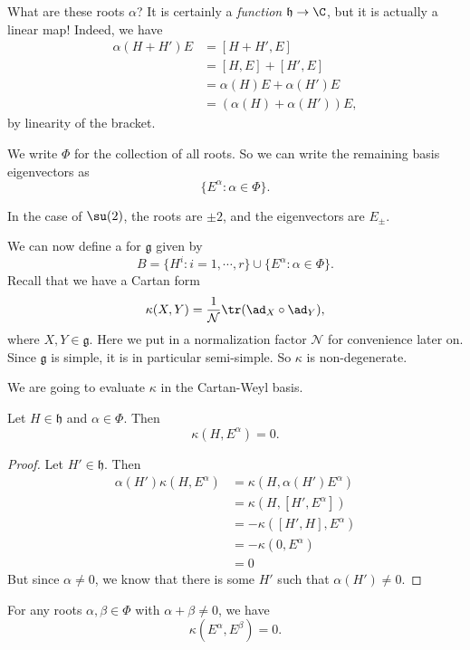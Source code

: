\documentclass[a4paper]{article}
\begin{document}
What are these roots $\alpha$? It is certainly a \emph{function} $\mathfrak{h} \to \C$, but it is actually a linear map! Indeed, we have
\begin{align*}
  \alpha(H + H')E &= [H + H', E] \\
  &= [H, E] + [H', E] \\
  &= \alpha(H) E + \alpha(H') E \\
  &= (\alpha(H) + \alpha(H'))E,
\end{align*}
by linearity of the bracket.

We write $\Phi$\index{$\Phi$} for the collection of all roots. So we can write the remaining basis eigenvectors as
\[
  \{E^\alpha: \alpha \in \Phi\}.
\]
\begin{eg}
  In the case of $\su(2)$, the roots are $\pm 2$, and the eigenvectors are $E_{\pm}$.
\end{eg}

We can now define a  for $\mathfrak{g}$ given by
\[
  B = \{H^i: i = 1, \cdots, r\} \cup \{E^\alpha: \alpha \in \Phi\}.
\]
Recall that we have a Cartan form
\[
 \kappa(X, Y) = \frac{1}{\mathcal{N}} \tr(\ad_X \circ \ad_Y),
\]
where $X, Y \in \mathfrak{g}$. Here we put in a normalization factor $\mathcal{N}$ for convenience later on. Since $\mathfrak{g}$ is simple, it is in particular semi-simple. So $\kappa$ is non-degenerate.

We are going to evaluate $\kappa$ in the Cartan-Weyl basis.

\begin{lemma}
  Let $H \in \mathfrak{h}$ and $\alpha \in \Phi$. Then
  \[
    \kappa(H, E^\alpha) = 0.
  \]
\end{lemma}
\begin{proof}
  Let $H' \in \mathfrak{h}$. Then
  \begin{align*}
    \alpha(H')\kappa(H, E^\alpha) &= \kappa(H, \alpha(H') E^\alpha) \\
    &= \kappa(H, [H', E^\alpha])\\
    &= -\kappa([H', H], E^\alpha)\\
    &= -\kappa(0, E^\alpha)\\
    &= 0
  \end{align*}
  But since $\alpha \not= 0$, we know that there is some $H'$ such that $\alpha(H') \not= 0$.
\end{proof}

\begin{lemma}
  For any roots $\alpha, \beta \in \Phi$ with $\alpha + \beta \not= 0$, we have
  \[
    \kappa(E^\alpha, E^\beta) = 0.
  \]
\end{lemma}
\end{document}
